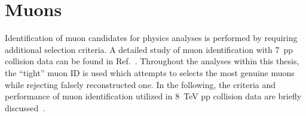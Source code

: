 
\section{Muons}
\label{sec:reconstruction-muons}

Identification of muon candidates for physics analyses is performed by requiring additional selection criteria. A detailed study of muon identification with 7~\TeV pp collision data can be found in Ref.~\cite{Chatrchyan:2012xi}. Throughout the analyses within this thesis, the ``tight'' muon ID is used which attempts to selects the most genuine muons while rejecting falsely reconstructed one. In the following, the criteria and performance of muon identification utilized in 8~TeV pp collision data are briefly discussed~\cite{CMS-DP-2013-009}.

